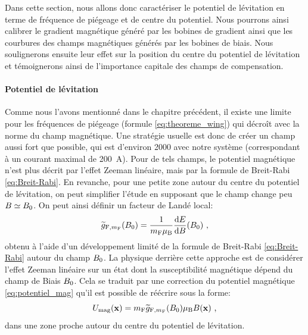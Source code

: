 Dans cette section, nous allons donc caractériser le potentiel de lévitation en terme de fréquence de piégeage et de centre du potentiel. Nous pourrons ainsi calibrer le gradient magnétique généré par les bobines de gradient ainsi que les courbures des champs magnétiques générés par les bobines de biais. Nous soulignerons ensuite leur effet sur la position du centre du potentiel de lévitation et témoignerons ainsi de l'importance capitale des champs de compensation.




\paragraph*{Potentiel de lévitation}
Comme nous l'avons mentionné dans le chapitre précédent, il existe une limite pour les fréquences de piégeage (formule \ref{eq:theoreme_wing}) qui décroît avec la norme du champ magnétique. Une stratégie usuelle est donc de créer un champ aussi fort que possible, qui est d'environ \SI{2000}{\gauss} avec notre système (correspondant à un courant maximal de \SI{200}{\ampere}). Pour de tels champs, le potentiel magnétique n'est plus décrit par l'effet Zeeman linéaire, mais par la formule de Breit-Rabi \ref{eq:Breit-Rabi}. En revanche, pour une petite zone autour du centre du potentiel de lévitation, on peut simplifier l'étude en supposant que le champ change peu $B\simeq B_0$. On peut ainsi définir un facteur de Landé local:
\begin{equation}
\widetilde{g}_{\mathrm{F},m_{\mathrm{F}}}(B_0)=\frac{1}{m_{\mathrm{F}} \mu_{\text{B}}} \frac{\mathrm{d}E}{\mathrm{d}B}(B_0) \text{ ,}
\label{eq:facteur_lande_local}
\end{equation}
obtenu à l'aide d'un développement limité de la formule de Breit-Rabi \ref{eq:Breit-Rabi} autour du champ $B_0$. La physique derrière cette approche est de considérer l'effet Zeeman linéaire sur un état dont la susceptibilité magnétique dépend du champ de Biais $B_0$. Cela se traduit par une correction du potentiel magnétique \ref{eq:potentiel_mag} qu'il est possible de réécrire sous la forme:
\begin{equation}
U_{\mathrm{mag}}(\mathbf{x})=m_{\mathrm{F}}\widetilde{g}_{\mathrm{F},m_{\mathrm{F}}}(B_0)\mu_{\text{B}} B(\mathbf{x}) \text{ ,}
\label{eq:potentiel_levitation}
\end{equation}
dans une zone proche autour du centre du potentiel de lévitation.



